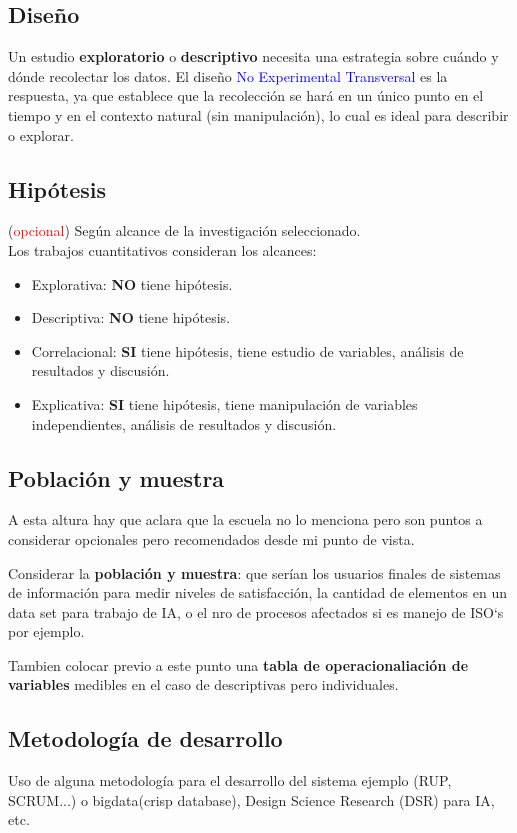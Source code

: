 \subsection{Diseño}
Un estudio \textbf{exploratorio} o \textbf{descriptivo} necesita una estrategia sobre cuándo y dónde recolectar los datos. El diseño \textcolor{blue}{No Experimental Transversal} es la respuesta, ya que establece que la recolección se hará en un único punto en el tiempo y en el contexto natural (sin manipulación), lo cual es ideal para describir o explorar.

\subsection{Hipótesis}
(\textcolor{red}{opcional}) Según alcance de la investigación seleccionado.\\

Los trabajos cuantitativos consideran los alcances:
\begin{itemize}
	\item Explorativa: \textbf{NO} tiene hipótesis.
	\item Descriptiva: \textbf{NO} tiene hipótesis.
	\item Correlacional: \textbf{SI} tiene hipótesis, tiene estudio de variables, análisis de resultados y discusión.
	\item Explicativa: \textbf{SI} tiene hipótesis, tiene manipulación de variables independientes, análisis de resultados y discusión.
\end{itemize}

\subsection{Población y muestra}
A esta altura hay que aclara que la escuela no lo menciona pero son puntos a considerar opcionales pero recomendados desde mi punto de vista.

Considerar la \textbf{población y muestra}: que serían los usuarios finales de sistemas de información para medir niveles de satisfacción, la cantidad de elementos en un data set para trabajo de IA, o el nro de procesos afectados si es manejo de ISO`s por ejemplo.

Tambien colocar previo a este punto una \textbf{tabla de operacionaliación de variables} medibles en el caso de descriptivas pero individuales. 

\subsection{Metodología de desarrollo}
Uso de alguna metodología para el desarrollo del sistema ejemplo (RUP, SCRUM...) o bigdata(crisp database), Design Science Research (DSR) para IA, etc.